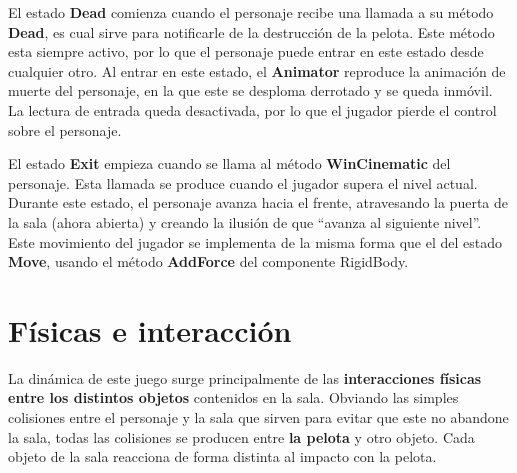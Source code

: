 El estado \textbf{Dead} comienza cuando el personaje recibe una llamada a su método \textbf{Dead}, es cual sirve para notificarle de la destrucción de la pelota. Este método esta siempre activo, por lo que el personaje puede entrar en este estado desde cualquier otro. Al entrar en este estado, el \textbf{Animator} reproduce la animación de muerte del personaje, en la que este se desploma derrotado y se queda inmóvil. La lectura de entrada queda desactivada, por lo que el jugador pierde el control sobre el personaje.

El estado \textbf{Exit} empieza cuando se llama al método \textbf{WinCinematic} del personaje. Esta llamada se produce cuando el jugador supera el nivel actual. Durante este estado, el personaje avanza hacia el frente, atravesando la puerta de la sala (ahora abierta) y creando la ilusión de que ``avanza al siguiente nivel''. Este movimiento del jugador se implementa de la misma forma que el del estado \textbf{Move}, usando el método \textbf{AddForce} del componente RigidBody.

\section{Físicas e interacción}
La dinámica de este juego surge principalmente de las \textbf{interacciones físicas entre los distintos objetos} contenidos en la sala. Obviando las simples colisiones entre el personaje y la sala que sirven para evitar que este no abandone la sala, todas las colisiones se producen entre \textbf{la pelota} y otro objeto. Cada objeto de la sala reacciona de forma distinta al impacto con la pelota.

